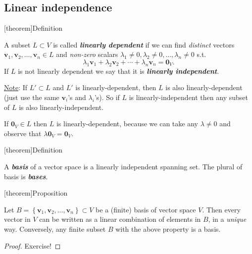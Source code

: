 \documentclass[12pt]{report}
\theoremstyle{definition}
\begin{document}
\subsection{Linear independence}

[theorem]{Definition}
\begin{linear independence}
    A subset $L \subset V$ is called \textbf{\emph{linearly dependent}} if
    we can find \emph{distinct} vectors $\mathbf{v}_1, \mathbf{v}_2,\ldots,\mathbf{v}_n \in L$
    and \emph{non-zero} scalars $\lambda_1 \neq 0, \lambda_2 \neq 0,\ldots,\lambda_n \neq 0$ s.t.\[
        \lambda_1 \mathbf{v}_1 + \lambda_2 \mathbf{v}_2 + \cdots + \lambda_n \mathbf{v}_n = \mathbf{0}_V.
    \]
    If $L$ is not linearly dependent we say that it is \textbf{\emph{linearly independent}}.
\end{linear independence}

\underline{Note}: If $L' \subset L$ and $L'$ is linearly-dependent,
then $L$ is also linearly-dependent (just use the same $\mathbf{v}_i$'s and $\lambda_i$'s).
So if $L$ is linearly-independent then any subset of $L$ is also linearly-independent.

\begin{ex}
    If $\mathbf{0}_V \in L$ then $L$ is linearly-dependent,
    because we can take any $\lambda \neq 0$ and observe that $\lambda \mathbf{0}_V = \mathbf{0}_V$.
\end{ex}

[theorem]{Definition}
\begin{basis}
    A \textbf{\emph{basis}} of a vector space is a linearly independent spanning set.
    The plural of basis is \textbf{\emph{bases}}.
\end{basis}

[theorem]{Proposition}
\begin{v can be written with element of basis}\label{prop:1}
    Let $B = \left\{\mathbf{v}_1, \mathbf{v}_2, \ldots, \mathbf{v}_n\right\} \subset V$ be a (finite)
    basis of vector space $V$. Then every vector in $V$ can be written as a linear combination
    of elements in $B$, in a \emph{unique} way.
    Conversely, any finite subset $B$ with the above property is a basis.
\end{v can be written with element of basis}

\begin{proof}
    Exercise!
\end{proof}
\end{document}
